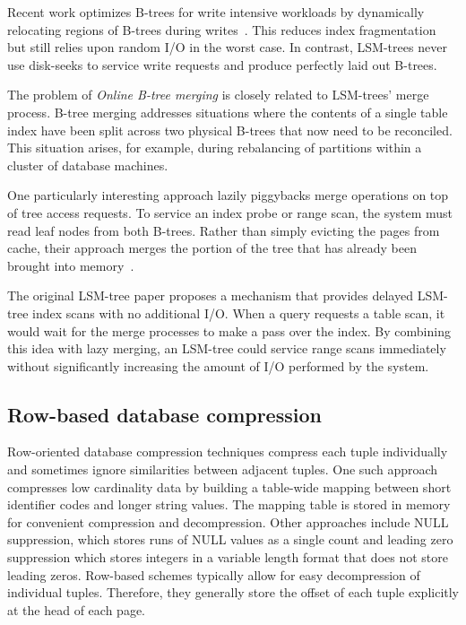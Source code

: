 \documentclass{vldb}
\begin{document}
Recent work optimizes B-trees for write intensive workloads by dynamically
relocating regions of B-trees during
writes~\cite{bTreeHighUpdateRates}.  This reduces index fragmentation
but still relies upon random I/O in the worst case.  In contrast,
LSM-trees never use disk-seeks to service write requests and produce
perfectly laid out B-trees.

The problem of {\em Online B-tree merging} is closely related to
LSM-trees' merge process.  B-tree merging addresses situations where
the contents of a single table index have been split across two
physical B-trees that now need to be reconciled.  This situation
arises, for example, during rebalancing of partitions within a cluster
of database machines.

One particularly interesting approach lazily piggybacks merge
operations on top of tree access requests.  To service an index
probe or range scan, the system must read leaf nodes from both B-trees.
Rather than simply evicting the pages from cache, their approach merges
the portion of the tree that has already been brought into
memory~\cite{onlineMerging}.

The original LSM-tree paper proposes a mechanism that provides delayed
LSM-tree index scans with no additional I/O.  When a query requests a table scan, it would wait for
the merge processes to make a pass over the index.
By combining this idea with lazy merging, an LSM-tree could service
range scans immediately without significantly increasing the amount of
I/O performed by the system.

\subsection{Row-based database compression}

Row-oriented database compression techniques compress each tuple
individually and sometimes ignore similarities between adjacent
tuples.  One such approach compresses low cardinality data by building a
table-wide mapping between short identifier codes and longer string
values. The mapping table is stored in memory for convenient
compression and decompression.  Other approaches include NULL
suppression, which stores runs of NULL values as a single count and
leading zero suppression which stores integers in a variable length
format that does not store leading zeros.  Row-based schemes typically
allow for easy decompression of individual tuples.  Therefore, they
generally store the offset of each tuple explicitly at the head of
each page.
\end{document}
